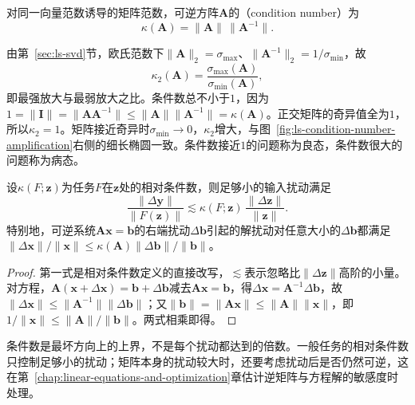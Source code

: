 \begin{definition}[可逆矩阵的条件数]
\label{def:matrix-analysis-condition-number}
对同一向量范数诱导的矩阵范数，可逆方阵$\bm A$的（condition number）为
\begin{equation}
 \kappa(\bm A)=\lVert\bm A\rVert\,\lVert\bm A^{-1}\rVert .
 \label{eq:matrix-analysis-condition-number}
\end{equation}
\end{definition}
由第~\ref{sec:ls-svd}节，欧氏范数下$\lVert\bm A\rVert_2=\sigma_{\max}$、$\lVert\bm A^{-1}\rVert_2=1/\sigma_{\min}$，故
\begin{equation}
 \kappa_2(\bm A)=\frac{\sigma_{\max}(\bm A)}{\sigma_{\min}(\bm A)},
 \label{eq:matrix-analysis-spectral-condition-number}
\end{equation}
即最强放大与最弱放大之比。条件数总不小于$1$，因为$1=\lVert\bm I\rVert=\lVert\bm A\bm A^{-1}\rVert\leq\lVert\bm A\rVert\lVert\bm A^{-1}\rVert=\kappa(\bm A)$。正交矩阵的奇异值全为$1$，所以$\kappa_2=1$。矩阵接近奇异时$\sigma_{\min}\to0$，$\kappa_2$增大，与图~\ref{fig:ls-condition-number-amplification}右侧的细长椭圆一致。条件数接近$1$的问题称为良态，条件数很大的问题称为病态。

\begin{theorem}[条件数基本界]
\label{thm:matrix-analysis-condition-number-bound}
设$\kappa(F;\bm z)$为任务$F$在$\bm z$处的相对条件数，则足够小的输入扰动满足
\begin{equation}
 \frac{\lVert\Delta\bm y\rVert}{\lVert F(\bm z)\rVert}
 \lesssim\kappa(F;\bm z)\,\frac{\lVert\Delta\bm z\rVert}{\lVert\bm z\rVert}.
 \label{eq:matrix-analysis-condition-number-bound}
\end{equation}
特别地，可逆系统$\bm A\bm x=\bm b$的右端扰动$\Delta\bm b$引起的解扰动对任意大小的$\Delta\bm b$都满足$\lVert\Delta\bm x\rVert/\lVert\bm x\rVert\leq\kappa(\bm A)\lVert\Delta\bm b\rVert/\lVert\bm b\rVert$。
\end{theorem}
\begin{proof}
第一式是相对条件数定义的直接改写，$\lesssim$表示忽略比$\lVert\Delta\bm z\rVert$高阶的小量。对方程，$\bm A(\bm x+\Delta\bm x)=\bm b+\Delta\bm b$减去$\bm A\bm x=\bm b$，得$\Delta\bm x=\bm A^{-1}\Delta\bm b$，故$\lVert\Delta\bm x\rVert\leq\lVert\bm A^{-1}\rVert\lVert\Delta\bm b\rVert$；又$\lVert\bm b\rVert=\lVert\bm A\bm x\rVert\leq\lVert\bm A\rVert\lVert\bm x\rVert$，即$1/\lVert\bm x\rVert\leq\lVert\bm A\rVert/\lVert\bm b\rVert$。两式相乘即得。
\end{proof}

条件数是最坏方向上的上界，不是每个扰动都达到的倍数。一般任务的相对条件数只控制足够小的扰动；矩阵本身的扰动较大时，还要考虑扰动后是否仍然可逆，这在第~\ref{chap:linear-equations-and-optimization}章估计逆矩阵与方程解的敏感度时处理。

